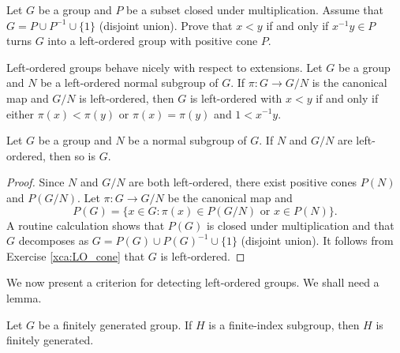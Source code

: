 \begin{exercise}
\label{xca:LO_cone}
	Let $G$ be a group and $P$ be a subset closed under multiplication. Assume that 
	$G=P\cup P^{-1}\cup \{1\}$ (disjoint union). Prove that $x<y$ if and only if
	$x^{-1}y\in P$ turns $G$ into a left-ordered group with positive cone $P$.
\end{exercise}

Left-ordered groups behave nicely with respect to extensions. Let $G$ be a group
and $N$ be a left-ordered normal subgroup of $G$. If $\pi\colon G\to G/N$ is the 
canonical map and $G/N$ is left-ordered, then
$G$ is left-ordered with
$x<y$ if and only if either $\pi(x)<\pi(y)$ or $\pi(x)=\pi(y)$ and $1<x^{-1}y$. 


\begin{proposition}
	Let $G$ be a group and $N$ be a normal subgroup of $G$. 
	If $N$ and $G/N$ are left-ordered, then so is $G$.
\end{proposition}

\begin{proof}
	Since $N$ and $G/N$ are both left-ordered, there exist positive cones 
	$P(N)$ and $P(G/N)$. Let $\pi\colon G\to G/N$ be the canonical map and 
	\[
		P(G)=\{x\in G:\pi(x)\in P(G/N)\text{ or }x\in P(N)\}.
	\]	
	A routine calculation shows that $P(G)$ is closed under multiplication 
	and that $G$ decomposes as $G=P(G)\cup P(G)^{-1}\cup \{1\}$ (disjoint union). It follows
	from Exercise \ref{xca:LO_cone} that 
	$G$ is left-ordered. 
\end{proof}


%

We now present a criterion for detecting left-ordered groups. We shall need 
a lemma. 

\begin{lemma}
	\label{lem:fg}
	Let $G$ be a finitely generated group. If $H$ is a finite-index subgroup, 
	then $H$ is finitely generated. 
\end{lemma}

